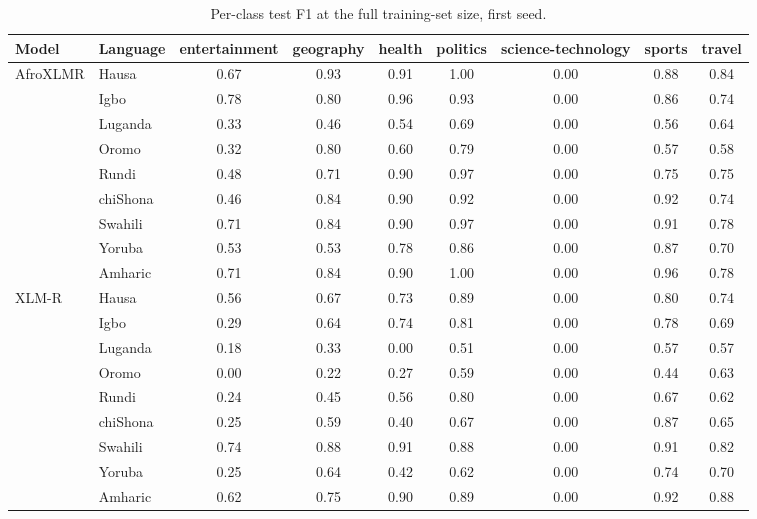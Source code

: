\begin{table}[t]
\centering
\caption{Per-class test F1 at the full training-set size, first seed.}
\label{tab:per_class_f1}
\small
\begin{tabular}{llccccccc}
\toprule
Model & Language & entertainment & geography & health & politics & science-technology & sports & travel \\
\midrule
AfroXLMR & Hausa & 0.67 & 0.93 & 0.91 & 1.00 & 0.00 & 0.88 & 0.84 \\
 & Igbo & 0.78 & 0.80 & 0.96 & 0.93 & 0.00 & 0.86 & 0.74 \\
 & Luganda & 0.33 & 0.46 & 0.54 & 0.69 & 0.00 & 0.56 & 0.64 \\
 & Oromo & 0.32 & 0.80 & 0.60 & 0.79 & 0.00 & 0.57 & 0.58 \\
 & Rundi & 0.48 & 0.71 & 0.90 & 0.97 & 0.00 & 0.75 & 0.75 \\
 & chiShona & 0.46 & 0.84 & 0.90 & 0.92 & 0.00 & 0.92 & 0.74 \\
 & Swahili & 0.71 & 0.84 & 0.90 & 0.97 & 0.00 & 0.91 & 0.78 \\
 & Yoruba & 0.53 & 0.53 & 0.78 & 0.86 & 0.00 & 0.87 & 0.70 \\
 & Amharic & 0.71 & 0.84 & 0.90 & 1.00 & 0.00 & 0.96 & 0.78 \\
\midrule
XLM-R & Hausa & 0.56 & 0.67 & 0.73 & 0.89 & 0.00 & 0.80 & 0.74 \\
 & Igbo & 0.29 & 0.64 & 0.74 & 0.81 & 0.00 & 0.78 & 0.69 \\
 & Luganda & 0.18 & 0.33 & 0.00 & 0.51 & 0.00 & 0.57 & 0.57 \\
 & Oromo & 0.00 & 0.22 & 0.27 & 0.59 & 0.00 & 0.44 & 0.63 \\
 & Rundi & 0.24 & 0.45 & 0.56 & 0.80 & 0.00 & 0.67 & 0.62 \\
 & chiShona & 0.25 & 0.59 & 0.40 & 0.67 & 0.00 & 0.87 & 0.65 \\
 & Swahili & 0.74 & 0.88 & 0.91 & 0.88 & 0.00 & 0.91 & 0.82 \\
 & Yoruba & 0.25 & 0.64 & 0.42 & 0.62 & 0.00 & 0.74 & 0.70 \\
 & Amharic & 0.62 & 0.75 & 0.90 & 0.89 & 0.00 & 0.92 & 0.88 \\
\bottomrule
\end{tabular}
\end{table}
